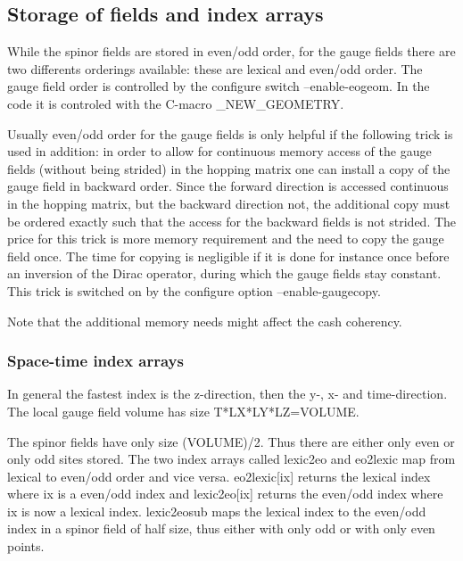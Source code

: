 \subsection{Storage of fields and index arrays}
\label{subsec:storage}

While the spinor fields are stored in even/odd order, for the gauge
fields there are two differents orderings available: these are
lexical and even/odd order. The gauge field order is controlled
by the configure switch {\ttfamily --enable-eogeom}. In the code it is
controled with the C-macro {\ttfamily \_NEW\_GEOMETRY}.

Usually even/odd order for the gauge fields is only helpful if the
following trick is used in addition: in order to allow for continuous
memory access of the gauge fields (without being strided) in the
hopping matrix one can install a copy of the gauge field in backward
order. Since the forward direction is accessed continuous in the
hopping matrix, but the backward direction not, the additional copy
must be ordered exactly such that the access for the backward fields
is not strided. The price for this trick is more memory requirement
and the need to copy the gauge field once. The time for copying is
negligible if it is done for instance once before an inversion of the
Dirac operator, during which the gauge fields stay constant. This
trick is switched on by the configure option {\ttfamily
  --enable-gaugecopy}.

Note that the additional memory needs might affect the cash coherency.

\subsubsection{Space-time index arrays}

In general the fastest index is the z-direction, then the y-, x- and
time-direction. The local gauge field volume has size
{\ttfamily T*LX*LY*LZ=VOLUME}. 

The spinor fields have only size {\ttfamily (VOLUME)/2}. Thus
there are either only even or only odd sites stored. The two
index arrays called {\ttfamily lexic2eo} and {\ttfamily eo2lexic} map
from lexical to even/odd order and vice versa. {\ttfamily
  eo2lexic[ix]} returns the lexical index where {\ttfamily ix} is a
even/odd index and {\ttfamily lexic2eo[ix]} returns the even/odd index
where {\ttfamily ix} is now a lexical index. {\ttfamily lexic2eosub}
maps the lexical index to the even/odd index in a spinor field of half
size, thus either with only odd or with only even points.

